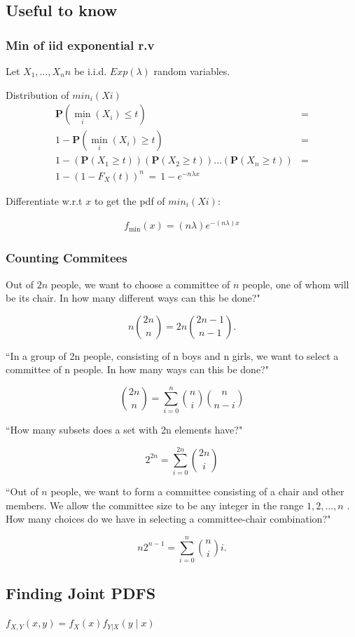 \subsection{Useful to know}

\subsubsection{Min of iid exponential r.v}
Let  $X_1,…,X_nn$  be i.i.d. $Exp(\lambda)$ random variables.

Distribution of $min_i(Xi)$ 
\begin{align*}
\mathbf{P}(\min _ i (X_ i)\leq t) &=\\
1-\mathbf{P}(\min _ i (X_ i)\geq t) &=\\
1-(\mathbf{P}(X_1\geq t))(\mathbf{P}(X_2\geq t))\ldots (\mathbf{P}(X_ n\geq t)) &=\\
1-(1-F_ X(t))^ n \, =\, 1-e^{-n\lambda x}
\end{align*}

Differentiate w.r.t $x$ to get the pdf of $min_i(Xi)$:

\begin{align*}
f_{\text {min}}(x)= (n\lambda ) e^{-(n\lambda ) x}
\end{align*}

\subsubsection{Counting Commitees}

Out of  $2n$  people, we want to choose a committee of $n$ people, one of whom will be its chair. In how many different ways can this be done?" 

$$n\binom {2n}{n}=2n\binom {2n-1}{n-1}.$$

“In a group of  2n  people, consisting of  n  boys and  n  girls, we want to select a committee of  n  people. In how many ways can this be done?"

$$\binom {2n}{n}=\sum _{i=0}^ n \binom {n}{i}\binom {n}{n-i}$$

“How many subsets does a set with  2n  elements have?" 

$$2^{2n}=\sum _{i=0}^{2n}\binom {2n}{i}$$

“Out of  $n$  people, we want to form a committee consisting of a chair and other members. We allow the committee size to be any integer in the range  $1,2,…,n$ . How many choices do we have in selecting a committee-chair combination?"

$$n2^{n-1}=\sum _{i=0}^ n \binom {n}{i}i.$$

\subsection{Finding Joint PDFS}

$f_{X,Y}(x,y)=f_ X(x)f_{Y|X}(y\mid x)$